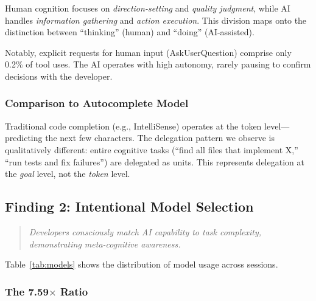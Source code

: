 Human cognition focuses on \textit{direction-setting} and \textit{quality judgment}, while AI handles \textit{information gathering} and \textit{action execution}. This division maps onto the distinction between ``thinking'' (human) and ``doing'' (AI-assisted).

Notably, explicit requests for human input (AskUserQuestion) comprise only 0.2\% of tool uses. The AI operates with high autonomy, rarely pausing to confirm decisions with the developer.

\subsubsection{Comparison to Autocomplete Model}

Traditional code completion (e.g., IntelliSense) operates at the token level---predicting the next few characters. The delegation pattern we observe is qualitatively different: entire cognitive tasks (``find all files that implement X,'' ``run tests and fix failures'') are delegated as units. This represents delegation at the \textit{goal} level, not the \textit{token} level.

\subsection{Finding 2: Intentional Model Selection}

\begin{quote}
\textit{Developers consciously match AI capability to task complexity, demonstrating meta-cognitive awareness.}
\end{quote}

Table~\ref{tab:models} shows the distribution of model usage across sessions.

\begin{table}[h]
\caption{Model Selection Patterns}
\label{tab:models}
\end{table}

\subsubsection{The 7.59$\times$ Ratio}

